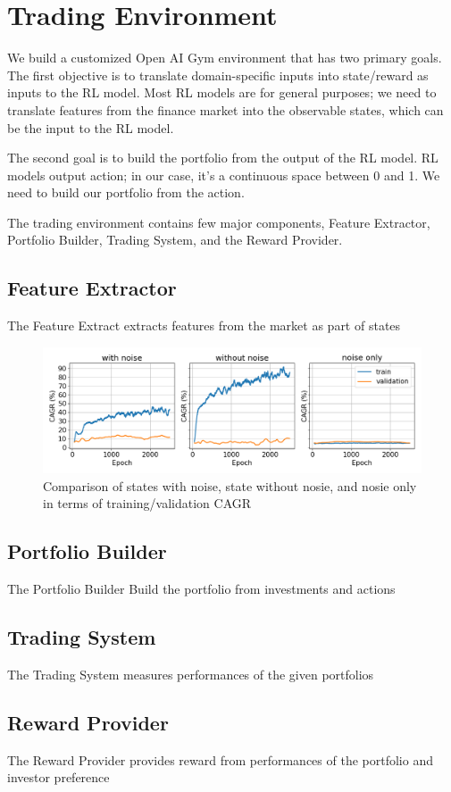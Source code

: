 \section{Trading Environment}
We build a customized Open AI Gym environment that has two primary goals. The first objective is to translate domain-specific inputs into state/reward as inputs to the RL model. Most RL models are for general purposes; we need to translate features from the finance market into the observable states, which can be the input to the RL model. 
\par
The second goal is to build the portfolio from the output of the RL model. RL models output action; in our case, it's a continuous space between 0 and 1. We need to build our portfolio from the action.
\par
The trading environment contains few major components, Feature Extractor, Portfolio Builder, Trading System, and the Reward Provider.

\subsection {Feature Extractor}
The Feature Extract extracts features from the market as part of states

\begin{figure}[ht]
  \includegraphics[width=15cm]{images/compare_noise.png}
  \caption{Comparison of states with noise, state without nosie, and nosie only in terms of training/validation CAGR }
  \label{fig:noise_diagram}
\end{figure}

\subsection {Portfolio Builder}
The Portfolio Builder Build the portfolio from investments and actions
\subsection {Trading System}
The Trading System measures performances of the given portfolios
\subsection {Reward Provider}
The Reward Provider provides reward from performances of the portfolio and investor preference